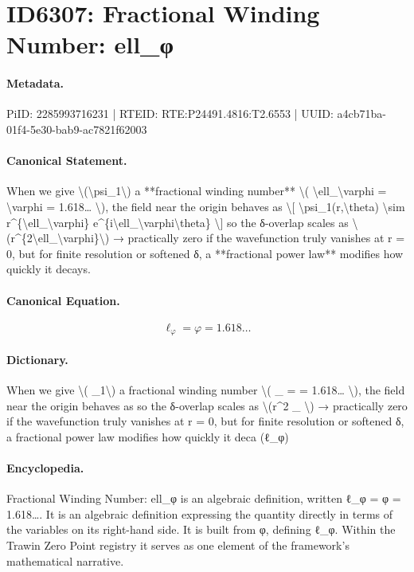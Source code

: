 \section*{ID6307: Fractional Winding Number: ell\_φ}
\paragraph{Metadata.}
PiID: 2285993716231 | RTEID: RTE:P24491.4816:T2.6553 | UUID: a4cb71ba-01f4-5e30-bab9-ac7821f62003

\paragraph{Canonical Statement.}
When we give \textbackslash{}(\textbackslash{}psi\_1\textbackslash{}) a **fractional winding number** \textbackslash{}( \textbackslash{}ell\_\textbackslash{}varphi = \textbackslash{}varphi = 1.618… \textbackslash{}), the field near the origin behaves as \textbackslash{}[ \textbackslash{}psi\_1(r,\textbackslash{}theta) \textbackslash{}sim r\textasciicircum{}\{\textbackslash{}ell\_\textbackslash{}varphi\} e\textasciicircum{}\{i\textbackslash{}ell\_\textbackslash{}varphi\textbackslash{}theta\} \textbackslash{}] so the δ-overlap scales as \textbackslash{}(r\textasciicircum{}\{2\textbackslash{}ell\_\textbackslash{}varphi\}\textbackslash{}) → practically zero if the wavefunction truly vanishes at r = 0, but for finite resolution or softened δ, a **fractional power law** modifies how quickly it decays.

\paragraph{Canonical Equation.}
\[
\ell_\varphi = \varphi = 1.618…
\]

\paragraph{Dictionary.}
When we give \textbackslash{}( \_1\textbackslash{}) a fractional winding number \textbackslash{}( \_ = = 1.618… \textbackslash{}), the field near the origin behaves as so the δ-overlap scales as \textbackslash{}(r\textasciicircum{}2 \_ \textbackslash{}) → practically zero if the wavefunction truly vanishes at r = 0, but for finite resolution or softened δ, a fractional power law modifies how quickly it deca (ℓ\_φ)

\paragraph{Encyclopedia.}
Fractional Winding Number: ell\_φ is an algebraic definition, written ℓ\_φ = φ = 1.618…. It is an algebraic definition expressing the quantity directly in terms of the variables on its right-hand side. It is built from φ, defining ℓ\_φ. Within the Trawin Zero Point registry it serves as one element of the framework's mathematical narrative.
